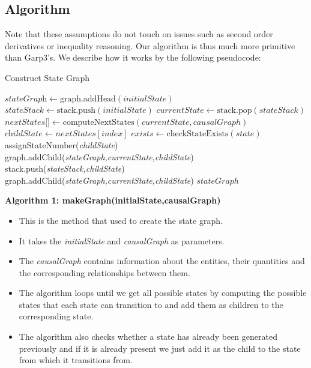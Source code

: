 \documentclass{article}
\begin{document}
\pagebreak

\subsection{Algorithm}

Note that these assumptions do not touch on issues such as second order derivatives or inequality reasoning. Our algorithm is thus much more primitive than Garp3's. We describe how it works by the following pseudocode:\\

\begin{algorithm}[!h]
	\caption{Construct State Graph}\label{stategraph}
	\begin{algorithmic}[1]
		\State $\textit{stateGraph} \gets \text{graph.addHead}(\textit{initialState})$
		\State $\textit{stateStack} \gets \text{stack.push}(\textit{initialState})$
		\State $\textit{currentState} \gets \text{stack.pop}(stateStack)$
		\State $\textit{nextStates[]} \gets \text{computeNextStates}(currentState,causalGraph)$
		\State $\textit{childState} \gets nextStates[index]$
		\State $\textit{exists} \gets \text{checkStateExists}(state)$
		\State assignStateNumber(\textit{childState})
		\State graph.addChild(\textit{stateGraph,currentState,childState})
		\State stack.push(\textit{stateStack,childState})
		\Else 
		\State graph.addChild(\textit{stateGraph,currentState,childState})
		\EndIf
		\EndFor
		\EndWhile
		\State \Return $stateGraph$
		\EndProcedure
	\end{algorithmic}
\end{algorithm}

\textbf{Algorithm 1: makeGraph(initialState,causalGraph)}
\begin{itemize}
	\item This is the method that used to create the state graph.
	\item It takes the \textit{initialState} and \textit{causalGraph} as parameters.
	\item The \textit{causalGraph} contains information about the entities,  their quantities and the corresponding relationships between them.
	\item The algorithm loops until we get all possible states by computing the possible states that each state can transition to and add them as children to the corresponding state. 
	\item The algorithm also checks whether a state has already been generated previously and if it is already present we just add it as the child to the state from which it transitions from.
\end{itemize}
\end{document}
